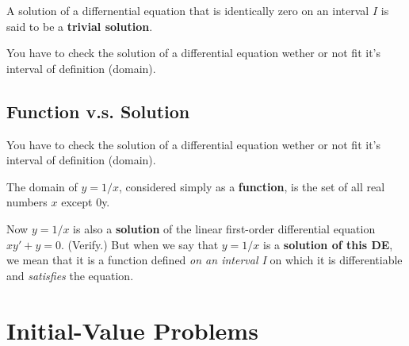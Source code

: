 \documentclass{beaulivre}
\begin{document}
A solution of a differnential equation that is identically zero
on an interval $I$ is said to be a \textbf{trivial solution}.

You have to check the solution of a differential equation wether
or not fit it's interval of definition (domain).

\subsection{Function v.s. Solution}

You have to check the solution of a differential equation wether
or not fit it's interval of definition (domain).

The domain of $y = 1/x$, considered simply as a \textbf{function}, 
is the set of all real numbers $x$ except $0$y. 

Now $y = 1/x$ is also a \textbf{solution} 
of the linear first-order differential equation
$xy' + y = 0$. (Verify.) But when we say that $y = 1/x$ 
is a \textbf{solution of this DE}, we
mean that it is a function defined 
\emph{on an interval I} on which it is differentiable and
\emph{satisfies} the equation\cite{fcde}.

\section{Initial-Value Problems}



\cleardoublepage

\end{document}
